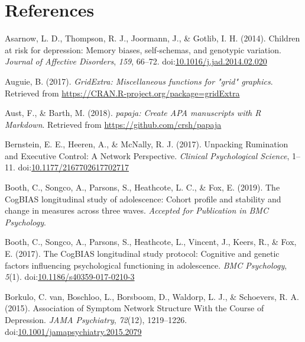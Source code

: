 \documentclass[man,floatsintext]{apa6}
\begin{document}
\newpage

\hypertarget{references}{%
\section{References}\label{references}}

\begingroup
\setlength{\parindent}{-0.5in}
\setlength{\leftskip}{0.5in}
\setlength{\parskip}{8pt}

\hypertarget{refs}{}
\leavevmode\hypertarget{ref-asarnow_children_2014}{}%
Asarnow, L. D., Thompson, R. J., Joormann, J., \& Gotlib, I. H. (2014). Children at risk for depression: Memory biases, self-schemas, and genotypic variation. \emph{Journal of Affective Disorders}, \emph{159}, 66--72. doi:\href{https://doi.org/10.1016/j.jad.2014.02.020}{10.1016/j.jad.2014.02.020}

\leavevmode\hypertarget{ref-R-gridExtra}{}%
Auguie, B. (2017). \emph{GridExtra: Miscellaneous functions for "grid" graphics}. Retrieved from \url{https://CRAN.R-project.org/package=gridExtra}

\leavevmode\hypertarget{ref-R-papaja}{}%
Aust, F., \& Barth, M. (2018). \emph{papaja: Create APA manuscripts with R Markdown}. Retrieved from \url{https://github.com/crsh/papaja}

\leavevmode\hypertarget{ref-bernstein_unpacking_2017}{}%
Bernstein, E. E., Heeren, A., \& McNally, R. J. (2017). Unpacking Rumination and Executive Control: A Network Perspective. \emph{Clinical Psychological Science}, 1--11. doi:\href{https://doi.org/10.1177/2167702617702717}{10.1177/2167702617702717}

\leavevmode\hypertarget{ref-booth_cogbias_2019}{}%
Booth, C., Songco, A., Parsons, S., Heathcote, L. C., \& Fox, E. (2019). The CogBIAS longitudinal study of adolescence: Cohort profile and stability and change in measures across three waves. \emph{Accepted for Publication in BMC Psychology}.

\leavevmode\hypertarget{ref-booth_cogbias_2017}{}%
Booth, C., Songco, A., Parsons, S., Heathcote, L., Vincent, J., Keers, R., \& Fox, E. (2017). The CogBIAS longitudinal study protocol: Cognitive and genetic factors influencing psychological functioning in adolescence. \emph{BMC Psychology}, \emph{5}(1). doi:\href{https://doi.org/10.1186/s40359-017-0210-3}{10.1186/s40359-017-0210-3}

\leavevmode\hypertarget{ref-van_borkulo_association_2015}{}%
Borkulo, C. van, Boschloo, L., Borsboom, D., Waldorp, L. J., \& Schoevers, R. A. (2015). Association of Symptom Network Structure With the Course of Depression. \emph{JAMA Psychiatry}, \emph{72}(12), 1219--1226. doi:\href{https://doi.org/10.1001/jamapsychiatry.2015.2079}{10.1001/jamapsychiatry.2015.2079}
\end{document}
